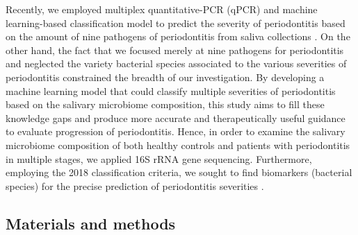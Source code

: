 \documentclass[11pt, a4paper, onecolumn, oneside]{report}
\begin{document}
            Recently, we employed multiplex quantitative-PCR (qPCR) and machine learning-based classification model to predict the severity of periodontitis based on the amount of nine pathogens of periodontitis from saliva collections \cite{Periodontitis-diagnosis-8}. On the other hand, the fact that we focused merely at nine pathogens for periodontitis and neglected the variety bacterial species associated to the various severities of periodontitis constrained the breadth of our investigation. By developing a machine learning model that could classify multiple severities of periodontitis based on the salivary microbiome composition, this study aims to fill these knowledge gaps and produce more accurate and therapeutically useful guidance to evaluate progression of periodontitis. Hence, in order to examine the salivary microbiome composition of both healthy controls and patients with periodontitis in multiple stages, we applied 16S rRNA gene sequencing. Furthermore, employing the 2018 classification criteria, we sought to find biomarkers (bacterial species) for the precise prediction of periodontitis severities \cite{Periodontitis-4, Periodontitis-13}.
        \newpage

        \subsection{Materials and methods}
\end{document}
